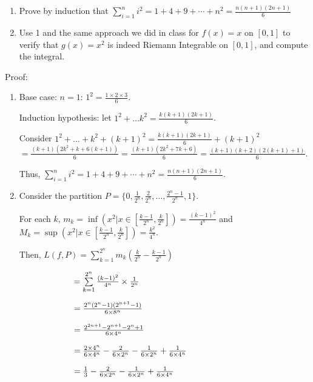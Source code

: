 \documentclass{article}
\begin{document}
\begin{enumerate}
\item Prove by induction that $\sum\limits_{i=1}^ni^2=1+4+9+\cdots+n^2=\frac{n(n+1)(2n+1)}{6}$
\item Use 1 and the same approach we did in class for $f(x)=x$ on $[0,1]$ to verify that $g(x)=x^2$ is indeed Riemann Integrable on $[0,1]$, and compute the integral.
\end{enumerate}

Proof:
\begin{enumerate}
    \item Base case: $n = 1$: $1^2 = \frac{1\times 2\times 3}{6}$.
    
    Induction hypothesis: let $1^2 + \dots k^2 = \frac{k(k+1)(2k+1)}{6}$.
    
    Consider $1^2 + \dots + k^2 + (k+1)^2 = \frac{k(k+1)(2k+1)}{6} + (k+1)^2$\\$ = \frac{(k+1)(2k^2+k + 6(k+1))}{6} = \frac{(k+1)(2k^2 + 7k + 6)}{6} = \frac{(k+1)(k+2)(2(k+1)+1)}{6}$.

    Thus, $\sum\limits_{i=1}^ni^2=1+4+9+\cdots+n^2=\frac{n(n+1)(2n+1)}{6}$.

    \item Consider the partition $ P = \{0, \frac{1}{2^n}, \frac{2}{2^n}, \dots , \frac{2^n-1}{2^n}, 1\}$.

    For each $k$, $m_k = \inf(x^2|x \in [\frac{k-1}{2^n}, \frac{k}{2^n}]) = \frac{(k-1)^2}{4^n}$ and $M_k = \sup(x^2|x \in [\frac{k-1}{2^n}, \frac{k}{2^n}]) = \frac{k^2}{4^n}$.

    Then, $L(f, P) = \sum\limits_{k=1}^{2^n} m_k(\frac{k}{2^n} - \frac{k-1}{2^n}) $
    
    $\hspace{2.25cm}= \sum\limits_{k=1}^{2^n} \frac{(k-1)^2}{4^n} \times \frac{1}{2^n}$
    
    $\hspace{2.25cm}= \frac{2^n(2^n-1)(2^{n+1}-1)}{6\times8^n}$
    
    $ \hspace{2.25cm}= \frac{2^{2n+1} -2^{n+1} - 2^n +1}{6\times4^n} $
    
    $\hspace{2.25cm}= \frac{2\times4^n}{6\times4^n} - \frac{2}{6\times2^n} - \frac{1}{6\times2^n} + \frac{1}{6\times 4^n} $
    
    $\hspace{2.25cm}= \frac{1}{3} - \frac{2}{6\times2^n} - \frac{1}{6\times2^n} + \frac{1}{6\times 4^n}$


\end{enumerate}
\end{document}
